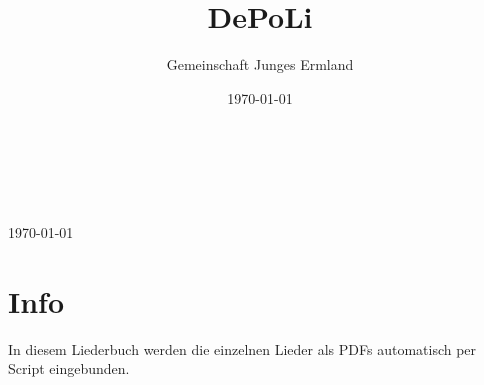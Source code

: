 \documentclass[a5paper,pagesize,10pt,bibtotoc,pointlessnumbers,
normalheadings,BCOR=10mm,DIV=calc,openany,twoside=true]{scrbook}
\title{DePoLi}
\author{Gemeinschaft Junges Ermland}
\date{\today}
\begin{document}
\begin{titlepage}
		\\
			
		\vspace{10mm}
		\\
		
		\vspace{10mm}
		\\
		
		\vspace{\fill}
		\centering \large{\today}
\end{titlepage}


%
%
%	

\tableofcontents


\newpage



\chapter{Info}

In diesem Liederbuch werden die einzelnen Lieder als PDFs automatisch per Script eingebunden.\\

\blindtext[5]











\printindex
\end{document}
